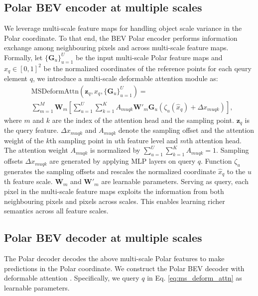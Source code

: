 \documentclass[letterpaper]{article} \usepackage{aaai23}  \usepackage{times}  \usepackage{helvet}  \usepackage{courier}  \usepackage[hyphens]{url}  \usepackage{graphicx} \urlstyle{rm} \def\UrlFont{\rm}  \usepackage{natbib}  \usepackage{caption} \frenchspacing  \setlength{\pdfpagewidth}{8.5in} \setlength{\pdfpageheight}{11in} \usepackage{algorithm}
\begin{document}
 \subsection{Polar BEV encoder at multiple scales}
We leverage multi-scale feature maps for handling object scale variance in the Polar coordinate. 
To that end,
the BEV Polar encoder performs information exchange among neighbouring pixels and across multi-scale feature maps. 
Formally, let $\{\mathbf{G}_u\}_{u=1}^U$
be the input multi-scale Polar feature maps and $\hat{x}_q \in [0, 1]^2$ be the normalized coordinates of the reference points for each qeury element $q$, we introduce a multi-scale deformable attention module \cite{zhu2020deformable} as:
\begin{equation}\label{eq:ms_deform_attn}
\begin{split}
    & \mathrm{MSDeformAttn}(\mathbf{z}_q,x_q, \{\mathbf{G}_u\}_{u=1}^U) = \\
    & \sum_{m=1}^M \mathbf{W}_m [\sum_{u=1}^{U}\sum_{k=1}^K A_{muqk}\mathbf{W'}_m\mathbf{G}_u(\zeta_u(\hat{x}_q)+\Delta x_{muqk})],
\end{split}
\end{equation}
where $m$ and $k$ are the index of the attention head and the sampling point. $\mathbf{z}_q$ is the query feature. $\Delta x_{muqk}$ and $A_{muqk}$ denote the sampling offset and the attention weight of the $k$th sampling point in $u$th feature level and $m$th attention head. The attention weight $A_{muqk}$ is normalized by $\sum_{u=1}^U\sum_{k=1}^K A_{muqk} = 1$. Sampling offsets $\Delta x_{muqk}$ are generated by applying MLP layers on query $q$. Function $\zeta_u$ generates the sampling offsets and rescales the normalized coordinate $\hat{x}_q$ to the $u$th feature scale. $\mathbf{W}_m$ and $\mathbf{W}'_m$ are learnable parameters. 
Serving as query, each pixel in the multi-scale feature maps exploits the information from both neighbouring pixels and pixels across scales.
This enables learning richer semantics across all feature scales.

\subsection{Polar BEV decoder at multiple scales}
The Polar decoder decodes the above multi-scale Polar features to make predictions in the Polar coordinate. 
We construct the Polar BEV decoder
with deformable attention \cite{zhu2020deformable}.
Specifically, we query $q$ in Eq. \eqref{eq:ms_deform_attn} as learnable parameters. 
\end{document}
